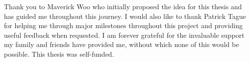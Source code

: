 \acknowledgements

\setcounter{page}{2}

Thank you to Maverick Woo who initially proposed the idea for this thesis and has guided me throughout this journey. I would also like to thank Patrick Tague for helping me through major milestones throughout this project and providing useful feedback when requested. I am forever grateful for the invaluable support my family and friends have provided me, without which none of this would be possible. This thesis was self-funded.